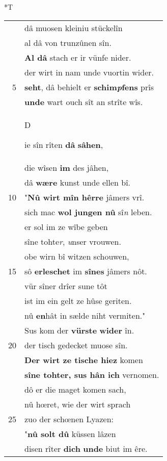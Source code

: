 \documentclass[8pt,a4paper,notitlepage]{article}
\begin{document}
\begin{table}[ht]
\begin{minipage}[t]{0.5\linewidth}
\small
\begin{center}*T
\end{center}
\begin{tabular}{rl}
 & dâ muosen kleiniu stückelîn\\ 
 & al dâ von trunzûnen sîn.\\ 
 & \textbf{Al dâ} stach er ir vünfe nider.\\ 
 & der wirt in nam unde vuortin wider.\\ 
5 & \textbf{seht}, dâ behielt er \textbf{schim\textit{p}fens} prîs\\ 
 & \textbf{unde} wart ouch sît an strîte wîs.\\ 
 & \begin{large}D\end{large}ie sîn rîten \textbf{dâ} \textbf{sâhen},\\ 
 & die wîsen \textbf{im} des jâhen,\\ 
 & dâ \textbf{wære} kunst unde ellen bî.\\ 
10 & "\textbf{Nû wirt mîn hêrre} jâmers vrî.\\ 
 & sich mac \textbf{wol jungen nû} sî\textit{n} leben.\\ 
 & er sol im ze wîbe geben\\ 
 & sîne tohte\textit{r}, \textit{u}nser vrouwen.\\ 
 & obe wirn bî witzen schouwen,\\ 
15 & sô \textbf{erleschet} im \textbf{sînes} jâmers nôt.\\ 
 & vür sîner drîer sune tôt\\ 
 & ist im ein gelt ze hûse geriten.\\ 
 & nû \textbf{en}hât in sælde niht vermiten."\\ 
 & Sus kom der \textbf{vürste} \textbf{wider} în.\\ 
20 & der tisch gedecket muose sîn.\\ 
 & \textbf{Der wirt ze tische hiez} komen\\ 
 & \textbf{sîne tohter, sus hân ich} vernomen.\\ 
 & dô er die maget komen sach,\\ 
 & nû hœret, wie der wirt sprach\\ 
25 & zuo der schœnen Lyazen:\\ 
 & "\textbf{nû solt dû} küssen lâzen\\ 
 & disen rîter \textbf{dich} \textbf{unde} biut im êre.\\ 

\end{tabular}
\end{minipage}
\end{table}
\end{document}
